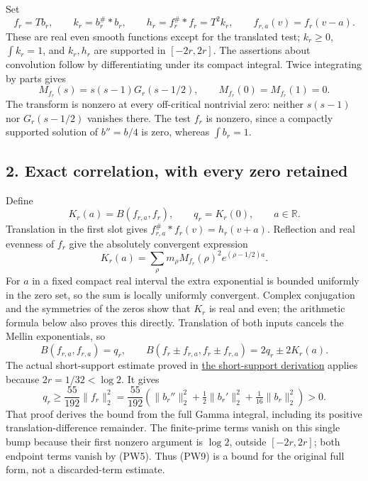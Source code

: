 \documentclass[
  10pt,
  a4paper,
]{article}
\begin{document}
Set \[
 f_r=Tb_r,\qquad k_r=b_r^\#*b_r,\qquad h_r=f_r^\#*f_r=T^2k_r,
\qquad f_{r,a}(v)=f_r(v-a).
\tag{PW4}
\] These are real even smooth functions except for the translated test;
\(k_r\ge0\), \(\int k_r=1\), and \(k_r,h_r\) are supported in
\([-2r,2r]\). The assertions about convolution follow by differentiating
under its compact integral. Twice integrating by parts gives \[
 M_{f_r}(s)=s(s-1)G_r(s-1/2),\qquad M_{f_r}(0)=M_{f_r}(1)=0.
\tag{PW5}
\] The transform is nonzero at every off-critical nontrivial zero:
neither \(s(s-1)\) nor \(G_r(s-1/2)\) vanishes there. The test \(f_r\)
is nonzero, since a compactly supported solution of \(b''=b/4\) is zero,
whereas \(\int b_r=1\).

\subsection{2. Exact correlation, with every zero
retained}\label{exact-correlation-with-every-zero-retained}

Define \[
 K_r(a)=B(f_{r,a},f_r),\qquad q_r=K_r(0),\qquad a\in\mathbb R.
\tag{PW6}
\] Translation in the first slot gives \(f_{r,a}^\#*f_r(v)=h_r(v+a)\).
Reflection and real evenness of \(f_r\) give the absolutely convergent
expression \[
 K_r(a)=\sum_\rho m_\rho M_{f_r}(\rho)^2e^{(\rho-1/2)a}.
\tag{PW7}
\] For \(a\) in a fixed compact real interval the extra exponential is
bounded uniformly in the zero set, so the sum is locally uniformly
convergent. Complex conjugation and the symmetries of the zeros show
that \(K_r\) is real and even; the arithmetic formula below also proves
this directly. Translation of both inputs cancels the Mellin
exponentials, so \[
 B(f_{r,a},f_{r,a})=q_r,\qquad
 B(f_r\pm f_{r,a},f_r\pm f_{r,a})=2q_r\pm2K_r(a).
\tag{PW8}
\] The actual short-support estimate proved in
\href{PRIMITIVE_SHORT_SUPPORT_DERIVATION.md}{the short-support
derivation} applies because \(2r=1/32<\log2\). It gives \[
 q_r\ge\frac{55}{192}\|f_r\|_2^2
 =\frac{55}{192}\left(\|b_r''\|_2^2+\tfrac12\|b_r'\|_2^2
                         +\tfrac1{16}\|b_r\|_2^2\right)>0.
\tag{PW9}
\] That proof derives the bound from the full Gamma integral, including
its positive translation-difference remainder. The finite-prime terms
vanish on this single bump because their first nonzero argument is
\(\log2\), outside \([-2r,2r]\); both endpoint terms vanish by (PW5).
Thus (PW9) is a bound for the original full form, not a discarded-term
estimate.
\end{document}
